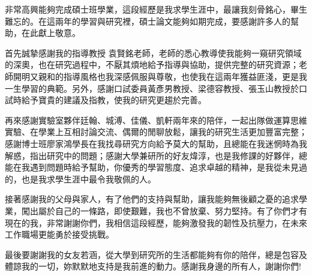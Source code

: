 \begin{acknowledgement}%

    非常高興能夠完成碩士班學業，這段經歷是我求學生涯中，最讓我刻骨銘心，畢生難忘的。在這兩年的學習與研究裡，碩士論文能夠如期完成，要感謝許多人的幫助，在此獻上敬意。

    首先誠摯感謝我的指導教授 袁賢銘老師，老師的悉心教導使我能夠一窺研究領域的深奧，也在研究過程中，不厭其煩地給予指導與協助，提供完整的研究資源；老師開明又親和的指導風格也我深感佩服與尊敬，也使我在這兩年獲益匪淺，更是我一生學習的典範。另外，感謝口試委員黃彥男教授、梁德容教授、張玉山教授於口試時給予寶貴的建議及指教，使我的研究更趨於完善。
    
    再來感謝實驗室夥伴廷翰、城溥、佳儀、凱軒兩年來的陪伴，一起出隊做運算思維實驗、在學業上互相討論交流、偶爾的閒聊放鬆，讓我的研究生活更加豐富完整；感謝博士班廖家鴻學長在我找尋研究方向給予莫大的幫助，且總能在我迷惘時為我解惑，指出研究中的問題；感謝大學兼研所的好友煒淳，也是我修課的好夥伴，總能在我遇到問題時給予幫助，你優秀的學習態度、追求卓越的精神，是我從未見過的，也是我求學生涯中最令我敬佩的人。
    
    接著感謝我的父母與家人，有了他們的支持與幫助，讓我能夠無後顧之憂的追求學業，闖出屬於自己的一條路，即使艱難，我也不曾放棄、努力堅持。有了你們才有現在的我，非常謝謝你們，我相信這段經歷，能夠激發我的韌性及抗壓力，在未來工作職場更能勇於接受挑戰。
    
    最後要謝謝我的女友若涵，從大學到研究所的生活都能夠有你的陪伴，總是包容及體諒我的一切，妳默默地支持是我前進的動力。感謝我身邊的所有人，謝謝你們!
\end{acknowledgement}